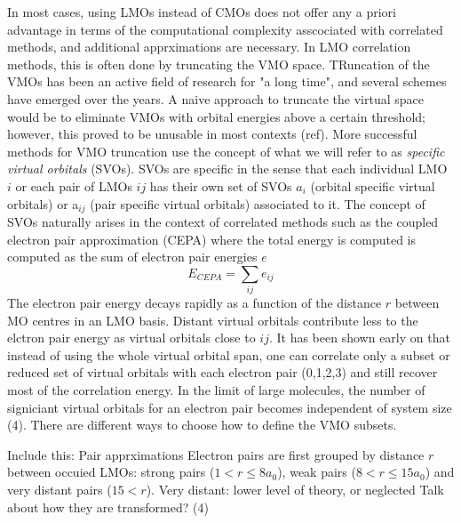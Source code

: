 In most cases, using LMOs instead of CMOs does not offer any a priori advantage in terms of the computational complexity asscociated with correlated methods, and additional apprximations are necessary. In LMO correlation methods, this is often done by truncating the VMO space. TRuncation of the VMOs has been an active field of research for "a long time", and several schemes have emerged over the years. A naive approach to truncate the virtual space would be to eliminate VMOs with orbital energies above a certain threshold; however, this proved to be unusable in most contexts (ref). More successful methods for VMO truncation use the concept of what we will refer to as \emph{specific virtual orbitals} (SVOs). SVOs are specific in the sense that each individual LMO $i$ or each pair of LMOs $ij$ has their own set of SVOs $a_i$ (orbital specific virtual orbitals) or a$_{ij}$ (pair specific virtual orbitals) associated to it.
The concept of SVOs naturally arises in the context of correlated methods such as the coupled electron pair approximation (CEPA) where the total energy is computed is computed as the sum of electron pair energies $e$
\begin{equation}
E_{CEPA} = \sum_{ij} e_{ij}
\end{equation}
The electron pair energy decays rapidly as a function of the distance $r$ between MO centres in an LMO basis. Distant virtual orbitals contribute less to the elctron pair energy as virtual orbitals close to ${ij}$. It has been shown early on that instead of using the whole virtual orbital span, one can correlate only a subset or reduced set of virtual orbitals with each electron pair (0,1,2,3) and still recover most of the correlation energy. In the limit of large molecules, the number of signiciant virtual orbitals for an electron pair becomes independent of system size (4). There are different ways to choose how to define the VMO subsets.

Include this: Pair apprximations Electron pairs are first grouped by distance $r$ between occuied LMOs: strong pairs ($1 < r \leq 8 a_0$), weak pairs ($8 < r \leq 15 a_0$) and very distant pairs ($15 < r$).
Very distant: lower level of theory, or neglected Talk about how they are transformed? (4)



